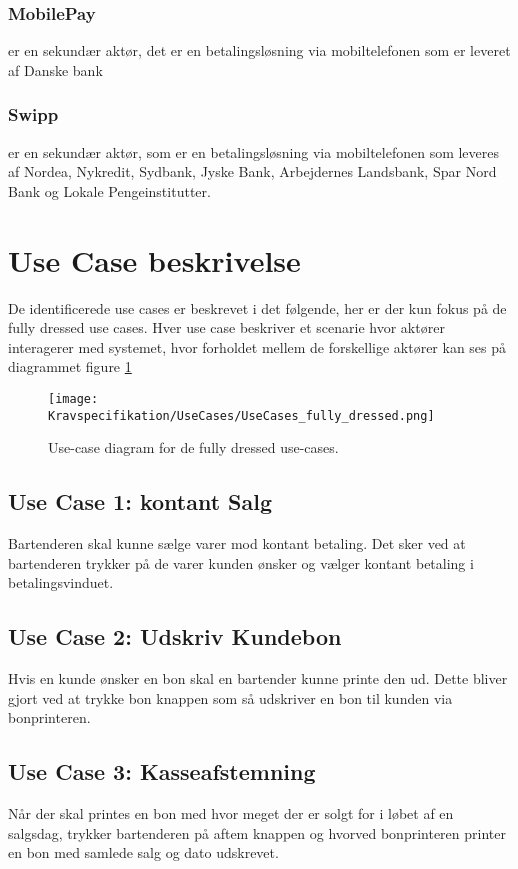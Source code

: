\subsubsection*{MobilePay} 
er en sekundær aktør, det er en betalingsløsning via mobiltelefonen som er leveret af Danske bank

\subsubsection*{Swipp} 
er en sekundær aktør, som er en betalingsløsning via mobiltelefonen som leveres af Nordea, Nykredit, Sydbank, Jyske Bank, Arbejdernes Landsbank, Spar Nord Bank og Lokale Pengeinstitutter.  

\newpage

\section{Use Case beskrivelse}
De identificerede use cases er beskrevet i det følgende, her er der kun fokus på de fully dressed use cases. Hver use case beskriver et scenarie hvor aktører interagerer med systemet, hvor forholdet mellem de forskellige aktører kan ses på diagrammet figure \ref{fig:fullydressedusecases}

\begin{figure}[H]
	\centering
	\texttt{[image: Kravspecifikation/UseCases/UseCases\_fully\_dressed.png]}
	\caption{Use-case diagram for de fully dressed use-cases.}
	\label{fig:fullydressedusecases}
\end{figure} 

\subsection*{Use Case 1: kontant Salg}
Bartenderen skal kunne sælge varer mod kontant betaling. Det sker ved at bartenderen trykker på de varer kunden ønsker og vælger kontant betaling i betalingsvinduet. 


\subsection*{Use Case 2: Udskriv Kundebon}
Hvis en kunde ønsker en bon skal en bartender kunne printe den ud. Dette bliver gjort ved at trykke bon knappen som så udskriver en bon til kunden via bonprinteren.  

\subsection*{Use Case 3: Kasseafstemning}
Når der skal printes en bon med hvor meget der er solgt for i løbet af en salgsdag, trykker bartenderen på aftem knappen og hvorved bonprinteren printer en bon med samlede salg og dato udskrevet. 

